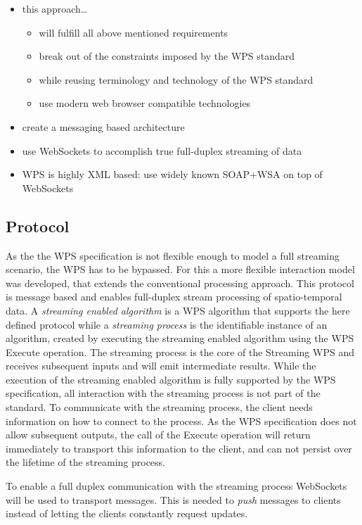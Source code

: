 \begin{itemize}
\begin{itemize}
		\end{itemize}
		\item this approach\dots
		\begin{itemize}
			\item will fulfill all above mentioned requirements
			\item break out of the constraints imposed by the WPS standard
			\item while reusing terminology and technology of the WPS standard
			\item use modern web browser compatible technologies
		\end{itemize}
		\item create a messaging based architecture
		\item use WebSockets to accomplish true full-duplex streaming of data
		\item WPS is highly XML based: use widely known SOAP+WSA on top of WebSockets
	\end{itemize}

	\subsection{Protocol}
		As the the \ac{WPS} specification is not flexible enough to model a full streaming scenario, the \ac{WPS} has to be bypassed. For this a more flexible interaction model was developed, that extends the conventional processing approach. This protocol is message based and enables full-duplex stream processing of spatio-temporal data. A \emph{streaming enabled algorithm} is a \ac{WPS} algorithm that supports the here defined protocol while a \emph{streaming process} is the identifiable instance of an algorithm, created by executing the streaming enabled algorithm using the \ac{WPS} Execute operation. The streaming process is the core of the Streaming \ac{WPS} and receives subsequent inputs and will emit intermediate results. While the execution of the streaming enabled algorithm is fully supported by the \ac{WPS} specification, all interaction with the streaming process is not part of the standard. To communicate with the streaming process, the client needs information on how to connect to the process. As the \ac{WPS} specification does not allow subsequent outputs, the call of the Execute operation will return immediately to transport this information to the client, and can not persist over the lifetime of the streaming process.

		To enable a full duplex communication with the streaming process WebSockets will be used to transport messages. This is needed to \emph{push} messages to clients instead of letting the clients constantly request updates.

